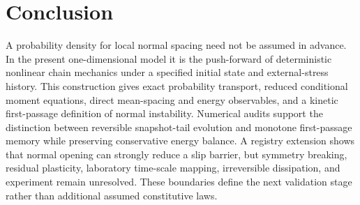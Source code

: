\documentclass[11pt]{article}
\begin{document}
\section{Conclusion}
A probability density for local normal spacing need not be assumed in advance. In the present one-dimensional model it is the push-forward of deterministic nonlinear chain mechanics under a specified initial state and external-stress history. This construction gives exact probability transport, reduced conditional moment equations, direct mean-spacing and energy observables, and a kinetic first-passage definition of normal instability. Numerical audits support the distinction between reversible snapshot-tail evolution and monotone first-passage memory while preserving conservative energy balance. A registry extension shows that normal opening can strongly reduce a slip barrier, but symmetry breaking, residual plasticity, laboratory time-scale mapping, irreversible dissipation, and experiment remain unresolved. These boundaries define the next validation stage rather than additional assumed constitutive laws.
\end{document}
